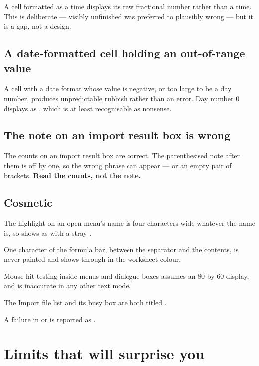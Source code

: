 A cell formatted as a time displays its raw fractional number rather than a
time. This is deliberate --- visibly unfinished was preferred to plausibly
wrong --- but it is a gap, not a design.

\subsection{A date-formatted cell holding an out-of-range value}

A cell with a date format whose value is negative, or too large to be a day
number, produces unpredictable rubbish rather than an error. Day number 0
displays as , which is at least recognisable as nonsense.

\subsection{The note on an import result box is wrong}

The counts on an import result box are correct. The parenthesised note after
them is off by one, so the wrong phrase can appear --- or an empty pair of
brackets. \textbf{Read the counts, not the note.}

\subsection{Cosmetic}

\begin{ccsteps}
\item The highlight on an open menu's name is four characters wide whatever the
name is, so  shows as  with a stray .
\item One character of the formula bar, between the separator and the contents,
is never painted and shows through in the worksheet colour.
\item Mouse hit-testing inside menus and dialogue boxes assumes an 80 by 60
display, and is inaccurate in any other text mode.
\item The Import file list and its busy box are both titled .
\item A failure in  or  is reported as
.
\end{ccsteps}

\section{Limits that will surprise you}

